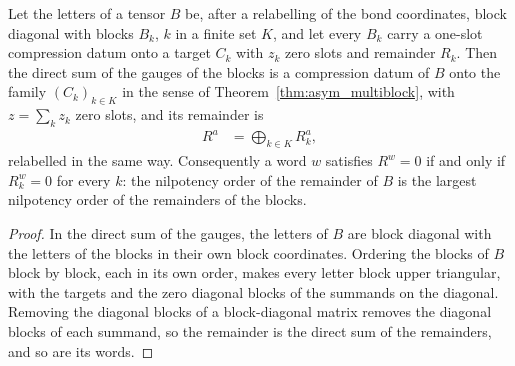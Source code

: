 \begin{lemma}%
    \label{thm:asymex_direct_sum_compression}
    \leanok
    Let the letters of a tensor $B$ be, after a relabelling of the bond
    coordinates, block diagonal with blocks $B_k$, $k$ in a finite set $K$,
    and let every $B_k$ carry a one-slot compression datum onto a target
    $C_k$ with $z_k$ zero slots and remainder $R_k$. Then the direct sum of
    the gauges of the blocks is a compression datum of $B$ onto the family
    $(C_k)_{k\in K}$ in the sense of Theorem~\ref{thm:asym_multiblock}, with
    $z=\sum_kz_k$ zero slots, and its remainder is
    \begin{align}
        R^a & =\bigoplus_{k\in K}R_k^a,
    \end{align}
    relabelled in the same way. Consequently a word $w$ satisfies $R^w=0$ if
    and only if $R_k^w=0$ for every $k$: the nilpotency order of the
    remainder of $B$ is the largest nilpotency order of the remainders of the
    blocks.
\end{lemma}

\begin{proof}
    \leanok
    In the direct sum of the gauges, the letters of $B$ are block diagonal
    with the letters of the blocks in their own block coordinates. Ordering
    the blocks of $B$ block by block, each in its own order, makes every
    letter block upper triangular, with the targets and the zero diagonal
    blocks of the summands on the diagonal. Removing the diagonal blocks of a
    block-diagonal matrix removes the diagonal blocks of each summand, so the
    remainder is the direct sum of the remainders, and so are its words.
\end{proof}

